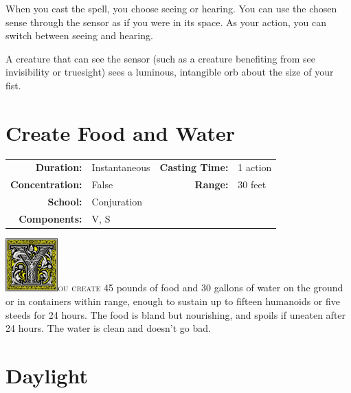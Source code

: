\documentclass[12pt,showtrims]{memoir}
\begin{document}
When you cast the spell, you choose seeing or hearing. You can use the chosen sense through the sensor as if you were in its space. As your action, you can switch between seeing and hearing.

A creature that can see the sensor (such as a creature benefiting from see invisibility or truesight) sees a luminous, intangible orb about the size of your fist.

\newpage
{}
\newpage
\section*{Create Food and Water}

{
\small\centering\vspace{-6pt}
\begin{tabular}{rlrl}
\toprule

\textbf{Duration:} & Instantaneous &
\textbf{Casting Time:} & 1 action \\
\textbf{Concentration:} & False &
\textbf{Range:} & 30 feet \\
\textbf{School:} & Conjuration \\
\textbf{Components:} & \multicolumn{3}{p{0.7\textwidth}}{V, S}\\

\bottomrule
\end{tabular}
}

\vspace{1\baselineskip}\noindent 
\lettrine[lines=4]{\includegraphics[height=58pt]{initials/Y.png}}{ou create 45} pounds of food and 30 gallons of water on the ground or in containers within range, enough to sustain up to fifteen humanoids or five steeds for 24 hours. The food is bland but nourishing, and spoils if uneaten after 24 hours. The water is clean and doesn't go bad.

\newpage
\section*{Daylight}
\end{document}
